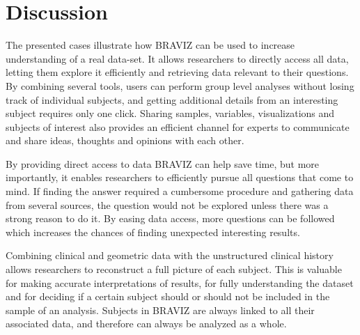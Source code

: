 \documentclass[twocolumn]{svjour3}
\begin{document}
\section{Discussion}
\label{sec:disc}

The presented cases illustrate how BRAVIZ can be used to increase understanding of a real data-set. 
It allows researchers to directly access all data, letting them explore it efficiently and retrieving data relevant to their questions. By combining several tools, users can perform group level analyses without losing track of individual subjects, and getting additional details from an interesting subject requires only one click. Sharing samples, variables, visualizations and subjects of interest also provides an efficient channel for experts to communicate and share ideas, thoughts and opinions with each other.

By providing direct access to  data BRAVIZ can help save time, but more importantly, it enables researchers to efficiently pursue all questions that come to mind. If finding the answer required a cumbersome procedure and gathering data from several sources, the question would not be explored unless there was a strong reason to do it. By easing data access, more questions can be followed which increases the chances of finding unexpected interesting results.


Combining clinical and geometric data with the unstructured clinical history allows researchers to reconstruct a full picture of each subject. This is valuable for making accurate interpretations of results, for fully understanding the dataset and for deciding if a certain subject should or should not be included in the sample of an analysis. Subjects in BRAVIZ are always linked to all their associated data, and therefore can always be analyzed as a whole.
\end{document}
